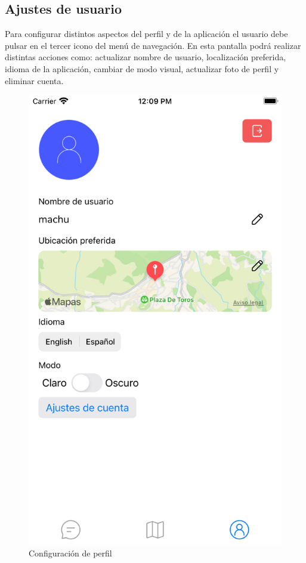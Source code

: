 \begin{appendices}
\section{Ajustes de usuario}
Para configurar distintos aspectos del perfil y de la aplicación el usuario debe pulsar en el tercer icono del menú de navegación. En esta pantalla podrá realizar distintas acciones como: actualizar nombre de usuario, localización preferida, idioma de la aplicación, cambiar de modo visual, actualizar foto de perfil y eliminar cuenta.
\begin{figure}[H]
        \centering
        \includegraphics[cframe=black 2pt,width=0.3\linewidth]{images/manual/confPerfil.png}
        \caption{Configuración de perfil}
        \label{fig:user_settings}
\end{figure}


\end{appendices}
